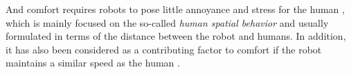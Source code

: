 \documentclass[journal]{IEEEtran}
\newcommand{\todohere}[1]{\hl{(\textbf{TODO:} #1)}}
\begin{document}
	And comfort requires robots to pose little annoyance and stress for the human \cite{kruse2013human}, which is mainly focused on the so-called \textit{human spatial behavior} \cite{aiello1987human} and usually formulated in terms of the distance between the robot and humans.
In addition, it has also been considered as a contributing factor to comfort if the robot maintains a similar speed as the human \cite{henry2010learning}.
	
	
\end{document}
